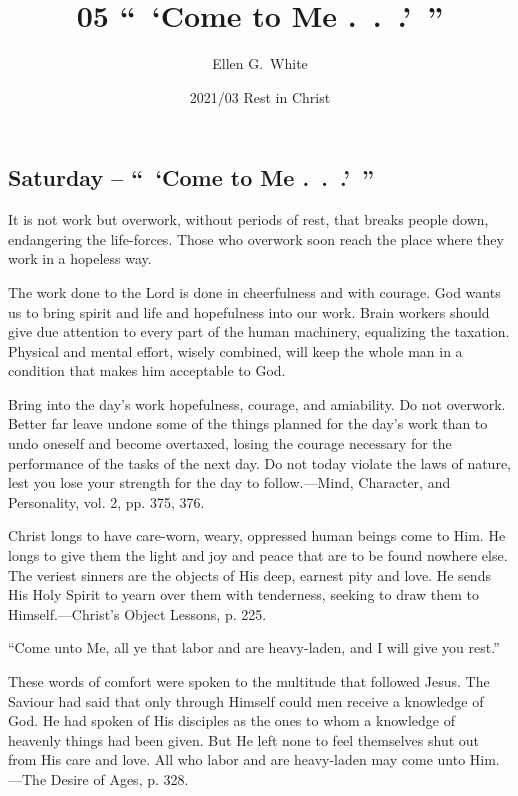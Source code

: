 \documentclass[a4paper, 10pt, twoside, headings=small]{scrartcl}
\title{05 “ ‘Come to Me . . .’ ”}
\author{Ellen G.\ White}
\date{2021/03 Rest in Christ}
\begin{document}
\maketitle

\thispagestyle{empty}

\pagestyle{fancy}

\begin{multicols}{2}

\section*{Saturday – “ ‘Come to Me . . .’ ”}

It is not work but overwork, without periods of rest, that breaks people down, endangering the life-forces. Those who overwork soon reach the place where they work in a hopeless way.

The work done to the Lord is done in cheerfulness and with courage. God wants us to bring spirit and life and hopefulness into our work. Brain workers should give due attention to every part of the human machinery, equalizing the taxation. Physical and mental effort, wisely combined, will keep the whole man in a condition that makes him acceptable to God.

Bring into the day’s work hopefulness, courage, and amiability. Do not overwork. Better far leave undone some of the things planned for the day’s work than to undo oneself and become overtaxed, losing the courage necessary for the performance of the tasks of the next day. Do not today violate the laws of nature, lest you lose your strength for the day to follow.—Mind, Character, and Personality, vol. 2, pp. 375, 376.

Christ longs to have care-worn, weary, oppressed human beings come to Him. He longs to give them the light and joy and peace that are to be found nowhere else. The veriest sinners are the objects of His deep, earnest pity and love. He sends His Holy Spirit to yearn over them with tenderness, seeking to draw them to Himself.—Christ’s Object Lessons, p. 225.

“Come unto Me, all ye that labor and are heavy-laden, and I will give you rest.”

These words of comfort were spoken to the multitude that followed Jesus. The Saviour had said that only through Himself could men receive a knowledge of God. He had spoken of His disciples as the ones to whom a knowledge of heavenly things had been given. But He left none to feel themselves shut out from His care and love. All who labor and are heavy-laden may come unto Him.—The Desire of Ages, p. 328.


\end{multicols}
\end{document}
